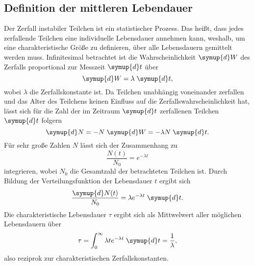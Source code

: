 \subsection{Definition der mittleren Lebendauer}
Der Zerfall instabiler Teilchen ist ein statistischer Prozess. Das heißt, dass jedes zerfallende
Teilchen eine individuelle Lebensdauer annehmen kann, weshalb, um eine charakteristische Größe zu definieren,
über alle Lebensdauern gemittelt werden muss. Infinitesimal betrachtet ist die Wahrscheinlichkeit $\symup{d}W$
des Zerfalls proportional zur Messzeit $\symup{d}t$ über
\begin{equation*}
    \symup{d}W = \lambda \; \symup{d}t,
\end{equation*}
wobei $\lambda$ die Zerfallskonstante ist.
Da Teilchen unabhängig voneinander zerfallen und das Alter des Teilchens keinen Einfluss auf die Zerfallswahrscheinlichkeit
hat, lässt sich für die Zahl der im Zeitraum $\symup{d}t$ zerfallenen Teilchen $\symup{d}t$ folgern
\begin{equation*}
    \symup{d} N = - N \; \symup{d}W = - \lambda N \; \symup{d}t.
\end{equation*}
Für sehr große Zahlen $N$ lässt sich der Zusammenhang zu
\begin{equation*}
    \frac{N(t)}{N_0} = e^{-\lambda t}
\end{equation*}
integrieren, wobei $N_0$ die Gesamtzahl der betrachteten Teilchen ist.
Durch Bildung der Verteilungsfunktion der Lebensdauer $t$ ergibt sich
\begin{equation*}
    \frac{\symup{d}N(t)}{N_0} = \lambda e^{-\lambda t} \; \symup{d}t.
\end{equation*}
Die charakteristische Lebensdauer $\tau$ ergibt sich als Mittwelwert aller möglichen Lebensdauern über
\begin{equation*}
    \tau = \int_0^{\infty} \lambda t e^{-\lambda t} \; \symup{d} t = \frac{1}{\lambda},
\end{equation*}
also reziprok zur charakteristischen Zerfallskonstanten.
